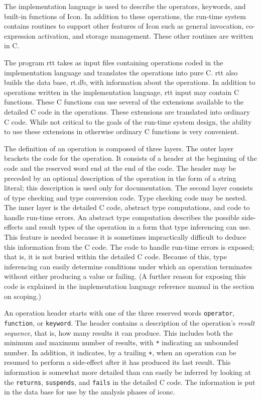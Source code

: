 The implementation language is used to describe the operators,
keywords, and built-in functions of Icon. In addition to these
operations, the run-time system contains routines to support other
features of Icon such as general invocation, co-expression activation,
and storage management. These other routines are written in C.

The program rtt takes as input files containing operations coded in
the implementation language and translates the operations into pure
C. rtt also builds the data base, rt.db, with information about the
operations. In addition to operations written in the implementation
language, rtt input may contain C functions. These C functions can use
several of the extensions available to the detailed C code in the
operations. These extensions are translated into ordinary C
code. While not critical to the goals of the run-time system design,
the ability to use these extensions in otherwise ordinary C functions
is very convenient.

The definition of an operation is composed of three layers. The outer
layer brackets the code for the operation. It consists of a header at
the beginning of the code and the reserved word end at the end of the
code. The header may be preceded by an optional description of the
operation in the form of a string literal; this description is used
only for documentation. The second layer consists of type checking and
type conversion code. Type checking code may be nested.  The inner
layer is the detailed C code, abstract type computations, and code to
handle run-time errors. An abstract type computation describes the
possible side-effects and result types of the operation in a form that
type inferencing can use. This feature is needed because it is
sometimes impractically difficult to deduce this information from the
C code. The code to handle run-time errors is exposed; that is, it is
not buried within the detailed C code. Because of this, type
inferencing can easily determine conditions under which an operation
terminates without either producing a value or failing. (A further
reason for exposing this code is explained in the implementation
language reference manual in the section on scoping.)

An operation header starts with one of the three reserved words
\texttt{operator}, \texttt{function}, or \texttt{keyword}.
The header contains a description of the operation's
\textit{result sequence}, that is, how many results it can produce.
This includes both the minimum and maximum number of results, with
\texttt{*} indicating an unbounded number. In addition, it indicates,
by a trailing \texttt{+}, when an operation can be resumed to perform
a side-effect after it has produced its last result. This information
is somewhat more detailed than can easily be inferred by looking at
the \texttt{returns}, \texttt{suspends}, and \texttt{fails} in the
detailed C code. The information is put in the data base for use by
the analysis phases of iconc.

